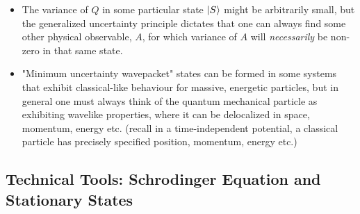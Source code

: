 \documentclass{article}
\begin{document}
\begin{itemize}
    \item The variance of $Q$ in some particular state $\ket{S}$ might be arbitrarily small, but the generalized uncertainty principle dictates that one can always find some other physical observable, $A$, for which variance of $A$ will \textit{necessarily} be non-zero in that same state. 
    
    \item "Minimum uncertainty wavepacket" states can be formed in some systems that exhibit classical-like behaviour for massive, energetic particles, but in general one must always think of the quantum mechanical particle as exhibiting wavelike properties, where it can be delocalized in space, momentum, energy etc. (recall in a time-independent potential, a classical particle has precisely specified position, momentum, energy etc.)
\end{itemize}

\subsection{Technical Tools: Schrodinger Equation and Stationary States}
\end{document}
